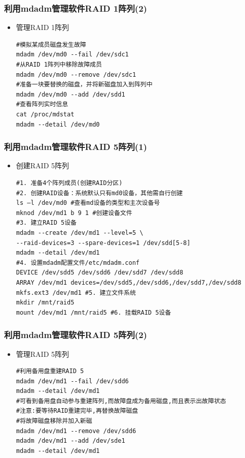 \documentclass[xcolor=svgnames,presentation]{beamer}
\begin{document}
\begin{frame}[fragile]
\frametitle{利用mdadm管理软件RAID 1阵列(2)}
\label{sec-4-10}
\begin{itemize}

\item 管理RAID 1阵列\\
\label{sec-4-10-1}%
\begin{verbatim}
#模拟某成员磁盘发生故障
mdadm /dev/md0 --fail /dev/sdc1
#从RAID 1阵列中移除故障成员
mdadm /dev/md0 --remove /dev/sdc1
#准备一块要替换的磁盘，并将新磁盘加入到阵列中
mdadm /dev/md0 --add /dev/sdd1
#查看阵列实时信息
cat /proc/mdstat
mdadm --detail /dev/md0
\end{verbatim}
\end{itemize} %
\end{frame}
\begin{frame}[fragile]
\frametitle{利用mdadm管理软件RAID 5阵列(1)}
\label{sec-4-11}
\begin{itemize}

\item 创建RAID 5阵列\\
\label{sec-4-11-1}%
\begin{verbatim}
#1. 准备4个阵列成员(创建RAID分区)
#2. 创建RAID设备：系统默认只有md0设备，其他需自行创建
ls –l /dev/md0 #查看md设备的类型和主次设备号
mknod /dev/md1 b 9 1 #创建设备文件
#3. 建立RAID 5设备
mdadm --create /dev/md1 --level=5 \
--raid-devices=3 --spare-devices=1 /dev/sdd[5-8]
mdadm --detail /dev/md1
#4. 设置mdadm配置文件/etc/mdadm.conf
DEVICE /dev/sdd5 /dev/sdd6 /dev/sdd7 /dev/sdd8
ARRAY /dev/md1 devices=/dev/sdd5,/dev/sdd6,/dev/sdd7,/dev/sdd8
mkfs.ext3 /dev/md1 #5. 建立文件系统
mkdir /mnt/raid5
mount /dev/md1 /mnt/raid5 #6. 挂载RAID 5设备
\end{verbatim}
\end{itemize} %
\end{frame}
\begin{frame}[fragile]
\frametitle{利用mdadm管理软件RAID 5阵列(2)}
\label{sec-4-12}
\begin{itemize}

\item 管理RAID 5阵列\\
\label{sec-4-12-1}%
\begin{verbatim}
#利用备用盘重建RAID 5
mdadm /dev/md1 --fail /dev/sdd6
mdadm --detail /dev/md1
#可看到备用盘自动参与重建阵列,而故障盘成为备用磁盘,而且表示出故障状态
#注意:要等待RAID重建完毕,再替换故障磁盘
#将故障磁盘移除并加入新磁
mdadm /dev/md1 --remove /dev/sdd6
mdadm /dev/md1 --add /dev/sde1
mdadm --detail /dev/md1
\end{verbatim}
\end{itemize} %
\end{frame}
\end{document}
